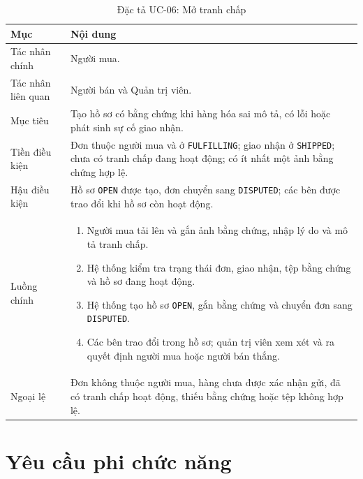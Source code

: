 \documentclass[../DoAn.tex]{subfiles}
\begin{document}
\begin{table}[H]
    \centering
    \caption{Đặc tả UC-06: Mở tranh chấp}
    \label{tab:uc-open-dispute}
    \footnotesize
    \setlength{\tabcolsep}{4pt}
    \renewcommand{\arraystretch}{1.03}
    \begin{tabular}{|>{\raggedright\arraybackslash}p{}|>{\raggedright\arraybackslash}p{}|}
        \hline
        \textbf{Mục} & \textbf{Nội dung} \\
        \hline
        Tác nhân chính & Người mua. \\
        \hline
        Tác nhân liên quan & Người bán và Quản trị viên. \\
        \hline
        Mục tiêu & Tạo hồ sơ có bằng chứng khi hàng hóa sai mô tả, có lỗi hoặc phát sinh sự cố giao nhận. \\
        \hline
        Tiền điều kiện & Đơn thuộc người mua và ở \texttt{FULFILLING}; giao nhận ở \texttt{SHIPPED}; chưa có tranh chấp đang hoạt động; có ít nhất một ảnh bằng chứng hợp lệ. \\
        \hline
        Hậu điều kiện & Hồ sơ \texttt{OPEN} được tạo, đơn chuyển sang \texttt{DISPUTED}; các bên được trao đổi khi hồ sơ còn hoạt động. \\
        \hline
        Luồng chính &
        \begin{enumerate}[label=\roman*., leftmargin=*, nosep]
            \item Người mua tải lên và gắn ảnh bằng chứng, nhập lý do và mô tả tranh chấp.
            \item Hệ thống kiểm tra trạng thái đơn, giao nhận, tệp bằng chứng và hồ sơ đang hoạt động.
            \item Hệ thống tạo hồ sơ \texttt{OPEN}, gắn bằng chứng và chuyển đơn sang \texttt{DISPUTED}.
            \item Các bên trao đổi trong hồ sơ; quản trị viên xem xét và ra quyết định người mua hoặc người bán thắng.
        \end{enumerate} \\
        \hline
        Ngoại lệ & Đơn không thuộc người mua, hàng chưa được xác nhận gửi, đã có tranh chấp hoạt động, thiếu bằng chứng hoặc tệp không hợp lệ. \\
        \hline
    \end{tabular}
\end{table}

\FloatBarrier

\section{Yêu cầu phi chức năng}
\label{section:2.4}
\end{document}
